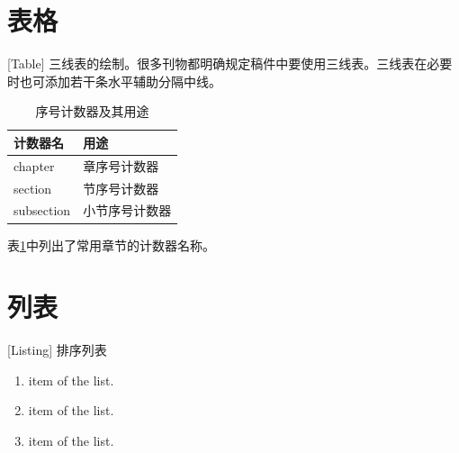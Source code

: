 \section{表格}[Table]
三线表的绘制。很多刊物都明确规定稿件中要使用三线表。三线表在必要时也可添加若干条水平辅助分隔中线。
\begin{table}[!ht]
\centering
\caption{序号计数器及其用途\label{tab:2-1}}
\begin{tabular}{@{}ll@{}}
\toprule[1pt]
计数器名   & 用途            \\ \midrule
chapter    & 章序号计数器    \\
section    & 节序号计数器    \\
subsection & 小节序号计数器  \\
\bottomrule[1pt]
\end{tabular}
\end{table}

表\ref{tab:2-1}中列出了常用章节的计数器名称。

\section{列表}[Listing]
排序列表
\begin{enumerate}
  \item item of the list.
  \item item of the list.
  \item item of the list.
\end{enumerate}


